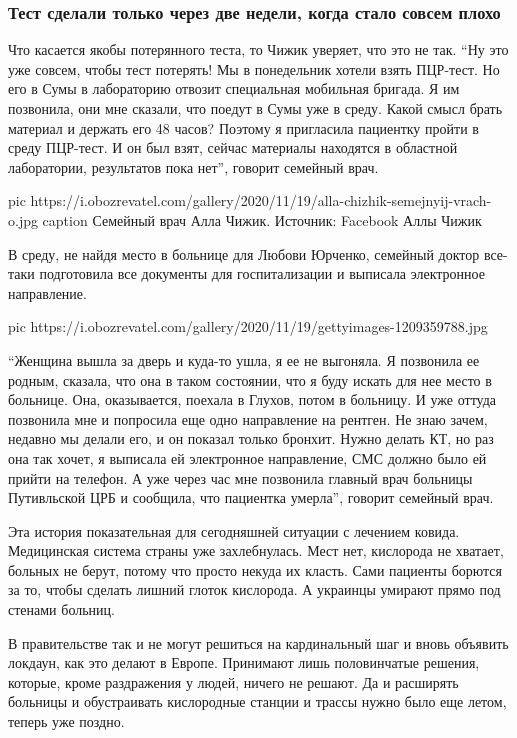  
 
 

\subsubsection{Тест сделали только через две недели, когда стало совсем плохо}
\label{sec:23_11_2020.news.ua.1.death_sumy_pcr_test_63_starushka.dve_nedeli}

Что касается якобы потерянного теста, то Чижик уверяет, что это не так. \enquote{Ну это
уже совсем, чтобы тест потерять! Мы в понедельник хотели взять ПЦР-тест. Но его
в Сумы в лабораторию отвозит специальная мобильная бригада. Я им позвонила, они
мне сказали, что поедут в Сумы уже в среду. Какой смысл брать материал и
держать его 48 часов? Поэтому я пригласила пациентку пройти в среду ПЦР-тест. И
он был взят, сейчас материалы находятся в областной лаборатории, результатов
пока нет}, \dshM говорит семейный врач.

\ifcmt
pic https://i.obozrevatel.com/gallery/2020/11/19/alla-chizhik-semejnyij-vrach-o.jpg
caption Семейный врач Алла Чижик. Источник: Facebook Аллы Чижик
\fi

В среду, не найдя место в больнице для Любови Юрченко, семейный доктор все-таки
подготовила все документы для госпитализации и выписала электронное
направление.

\ifcmt
pic https://i.obozrevatel.com/gallery/2020/11/19/gettyimages-1209359788.jpg
\fi

\enquote{Женщина вышла за дверь и куда-то ушла, я ее не выгоняла. Я позвонила ее
родным, сказала, что она в таком состоянии, что я буду искать для нее место в
больнице. Она, оказывается, поехала в Глухов, потом в больницу. И уже оттуда
позвонила мне и попросила еще одно направление на рентген. Не знаю зачем,
недавно мы делали его, и он показал только бронхит. Нужно делать КТ, но раз она
так хочет, я выписала ей электронное направление, СМС должно было ей прийти на
телефон. А уже через час мне позвонила главный врач больницы Путивльской ЦРБ и
сообщила, что пациентка умерла}, \dshM говорит семейный врач.

Эта история показательная для сегодняшней ситуации с лечением ковида.
Медицинская система страны уже захлебнулась. Мест нет, кислорода не хватает,
больных не берут, потому что просто некуда их класть. Сами пациенты борются за
то, чтобы сделать лишний глоток кислорода. А украинцы умирают прямо под стенами
больниц.

В правительстве так и не могут решиться на кардинальный шаг и вновь объявить
локдаун, как это делают в Европе. Принимают лишь половинчатые решения, которые,
кроме раздражения у людей, ничего не решают. Да и расширять больницы и
обустраивать кислородные станции и трассы нужно было еще летом, теперь уже
поздно.
